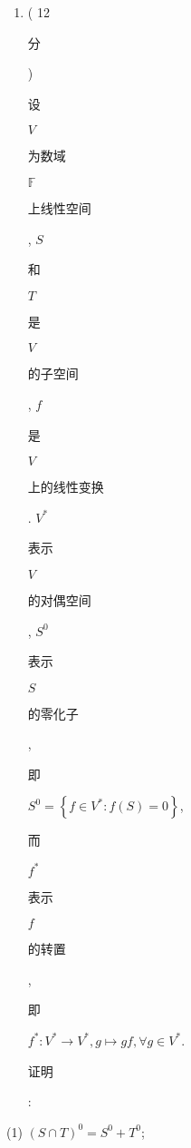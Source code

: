 \documentclass[10pt]{article}
\begin{document}
\begin{enumerate}
  \item ( 12 \begin{CJK}{UTF8}{mj}分\end{CJK}) \begin{CJK}{UTF8}{mj}设\end{CJK} $V$ \begin{CJK}{UTF8}{mj}为数域\end{CJK} $\mathbb{F}$ \begin{CJK}{UTF8}{mj}上线性空间\end{CJK}, $S$ \begin{CJK}{UTF8}{mj}和\end{CJK} $T$ \begin{CJK}{UTF8}{mj}是\end{CJK} $V$ \begin{CJK}{UTF8}{mj}的子空间\end{CJK}, $f$ \begin{CJK}{UTF8}{mj}是\end{CJK} $V$ \begin{CJK}{UTF8}{mj}上的线性变换\end{CJK}. $V^{*}$ \begin{CJK}{UTF8}{mj}表示\end{CJK} $V$ \begin{CJK}{UTF8}{mj}的对偶空间\end{CJK}, $S^{0}$ \begin{CJK}{UTF8}{mj}表示\end{CJK} $S$ \begin{CJK}{UTF8}{mj}的零化子\end{CJK}, \begin{CJK}{UTF8}{mj}即\end{CJK} $S^{0}=\left\{f \in V^{*}: f(S)=0\right\}$, \begin{CJK}{UTF8}{mj}而\end{CJK} $f^{*}$ \begin{CJK}{UTF8}{mj}表示\end{CJK} $f$ \begin{CJK}{UTF8}{mj}的转置\end{CJK}, \begin{CJK}{UTF8}{mj}即\end{CJK} $f^{*}: V^{*} \rightarrow V^{*}, g \mapsto g f, \forall g \in V^{*}$. \begin{CJK}{UTF8}{mj}证明\end{CJK}:

\end{enumerate}
(1) $(S \cap T)^{0}=S^{0}+T^{0}$;
\end{document}
